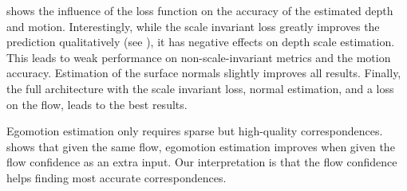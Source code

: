\documentclass[10pt,twocolumn,letterpaper]{article}
\begin{document}

 shows the influence of the loss function on the accuracy of the estimated depth and motion. Interestingly, while the scale invariant loss greatly improves the prediction qualitatively (see ), it has negative effects on depth scale estimation. 
This leads to weak performance on non-scale-invariant metrics and the motion accuracy. 
Estimation of the surface normals slightly improves all results.
Finally, the full architecture with the scale invariant loss, normal estimation, and a loss on the flow, leads to the best results. 

Egomotion estimation only requires sparse but high-quality correspondences.  shows that given the same flow, egomotion estimation improves when given the flow confidence as an extra input. Our interpretation is that the flow confidence helps finding most accurate correspondences. 
\end{document}

